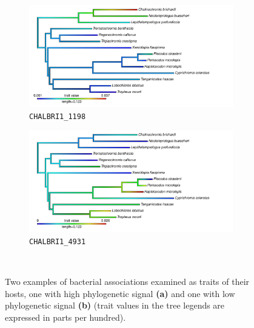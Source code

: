 
\begin{figure}
    \centering
    \begin{subfigure}[b]{0.45\textwidth}
        \includegraphics[width=3.5in]{FishPoo/figures/phylosig_heattree_highsig}
        \small
        \caption{{\tt CHALBRI1\_1198}}
    \end{subfigure}
    \begin{subfigure}[b]{0.45\textwidth}
        \includegraphics[width=3.5in]{FishPoo/figures/phylosig_heattree_lowsig}
        \small
        \caption{{\tt CHALBRI1\_4931}}
    \end{subfigure}\\
    \begin{subfigure}[b]{\textwidth}
    \end{subfigure}
    \caption{Two examples of bacterial associations examined as traits of their hosts, one with high phylogenetic signal \textbf{(a)} and one with low phylogenetic signal \textbf{(b)} (trait values in the tree legends are expressed in parts per hundred).}
    \label{fig:FP_fig4}
\end{figure}